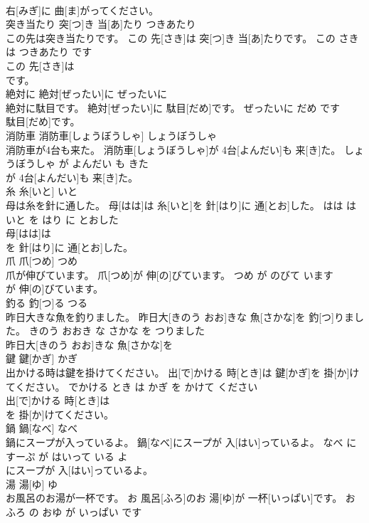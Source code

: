 \documentclass[8pt]{extreport}
\begin{document}
\begin{CJK}{UTF8}{min}
\\	右[みぎ]に 曲[ま]がってください。			
\\	突き当たり	突[つ]き 当[あ]たり	つきあたり	
\\	この先は突き当たりです。	この 先[さき]は 突[つ]き 当[あ]たりです。	この さき は つきあたり です	
\\	この 先[さき]は
\\	です。			
\\	絶対に	絶対[ぜったい]に	ぜったいに	
\\	絶対に駄目です。	絶対[ぜったい]に 駄目[だめ]です。	ぜったいに だめ です	
\\	駄目[だめ]です。			
\\	消防車	消防車[しょうぼうしゃ]	しょうぼうしゃ	
\\	消防車が4台も来た。	消防車[しょうぼうしゃ]が 4台[よんだい]も 来[き]た。	しょうぼうしゃ が よんだい も きた	
\\	が 4台[よんだい]も 来[き]た。			
\\	糸	糸[いと]	いと	
\\	母は糸を針に通した。	母[はは]は 糸[いと]を 針[はり]に 通[とお]した。	はは は いと を はり に とおした	
\\	母[はは]は
\\	を 針[はり]に 通[とお]した。			
\\	爪	爪[つめ]	つめ	
\\	爪が伸びています。	爪[つめ]が 伸[の]びています。	つめ が のびて います	
\\	が 伸[の]びています。			
\\	釣る	釣[つ]る	つる	
\\	昨日大きな魚を釣りました。	昨日大[きのう おお]きな 魚[さかな]を 釣[つ]りました。	きのう おおき な さかな を つりました	
\\	昨日大[きのう おお]きな 魚[さかな]を
\\	鍵	鍵[かぎ]	かぎ	
\\	出かける時は鍵を掛けてください。	出[で]かける 時[とき]は 鍵[かぎ]を 掛[か]けてください。	でかける とき は かぎ を かけて ください	
\\	出[で]かける 時[とき]は
\\	を 掛[か]けてください。			
\\	鍋	鍋[なべ]	なべ	
\\	鍋にスープが入っているよ。	鍋[なべ]にスープが 入[はい]っているよ。	なべ に すーぷ が はいって いる よ	
\\	にスープが 入[はい]っているよ。			
\\	湯	湯[ゆ]	ゆ	
\\	お風呂のお湯が一杯です。	お 風呂[ふろ]のお 湯[ゆ]が 一杯[いっぱい]です。	おふろ の おゆ が いっぱい です	

\end{CJK}
\end{document}
